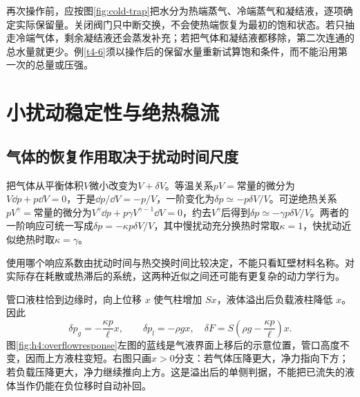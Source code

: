再次操作前，应按图\ref{fig:cold-trap}把水分为热端蒸气、冷端蒸气和凝结液，逐项确定实际保留量。关闭阀门只中断交换，不会使热端恢复为最初的饱和状态。若只抽走冷端气体，剩余凝结液还会蒸发补充；若把气体和凝结液都移除，第二次连通的总水量就更少。例\ref{t4-6}须以操作后的保留水量重新试算饱和条件，而不能沿用第一次的总量或压强。

\section{小扰动稳定性与绝热稳流}
\subsection{气体的恢复作用取决于扰动时间尺度}
把气体从平衡体积$V$微小改变为$V+\delta V$。等温关系$pV=\text{常量}$的微分为$V\dd p+p\dd V=0$，于是$\dd p/\dd V=-p/V$，一阶变化为$\delta p\simeq-p\delta V/V$。可逆绝热关系$pV^\gamma=\text{常量}$的微分为$V^\gamma\dd p+p\gamma V^{\gamma-1}\dd V=0$，约去$V^\gamma$后得到$\delta p\simeq-\gamma p\delta V/V$。两者的一阶响应可统一写成$\delta p=-\kappa p\delta V/V$，其中慢扰动充分换热时常取$\kappa=1$，快扰动近似绝热时取$\kappa=\gamma$。

使用哪个响应系数由扰动时间与热交换时间比较决定，不能只看缸壁材料名称。对实际存在耗散或热滞后的系统，这两种近似之间还可能有更复杂的动力学行为。


管口液柱恰到边缘时，向上位移 $x$ 使气柱增加 $Sx$，液体溢出后负载液柱降低 $x$。因此
\[\delta p_g=-\frac{\kappa p}{\ell}x,\qquad\delta p_l=-\rho gx,
\quad\delta F=S\left(\rho g-\frac{\kappa p}{\ell}\right)x.
\]
图\ref{fig:h4:overflowresponse}左图的蓝线是气液界面上移后的示意位置，管口高度不变，因而上方液柱变短。右图只画$x>0$分支：若气体压降更大，净力指向下方；若负载压降更大，净力继续推向上方。这是溢出后的单侧判据，不能把已流失的液体当作仍能在负位移时自动补回。



